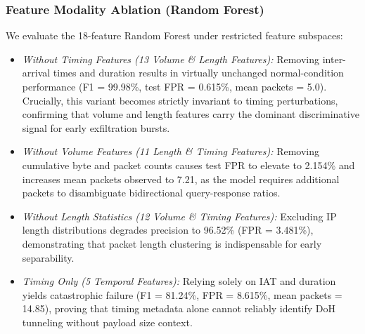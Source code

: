 \documentclass[conference]{IEEEtran}
\begin{document}
\subsubsection{Feature Modality Ablation (Random Forest)}
We evaluate the 18-feature Random Forest under restricted feature subspaces:
\begin{itemize}
    \item \emph{Without Timing Features (13 Volume \& Length Features):} Removing inter-arrival times and duration results in virtually unchanged normal-condition performance (F1 = 99.98\%, test FPR = 0.615\%, mean packets = 5.0). Crucially, this variant becomes strictly invariant to timing perturbations, confirming that volume and length features carry the dominant discriminative signal for early exfiltration bursts.
    \item \emph{Without Volume Features (11 Length \& Timing Features):} Removing cumulative byte and packet counts causes test FPR to elevate to 2.154\% and increases mean packets observed to 7.21, as the model requires additional packets to disambiguate bidirectional query-response ratios.
    \item \emph{Without Length Statistics (12 Volume \& Timing Features):} Excluding IP length distributions degrades precision to 96.52\% (FPR = 3.481\%), demonstrating that packet length clustering is indispensable for early separability.
    \item \emph{Timing Only (5 Temporal Features):} Relying solely on IAT and duration yields catastrophic failure (F1 = 81.24\%, FPR = 8.615\%, mean packets = 14.85), proving that timing metadata alone cannot reliably identify DoH tunneling without payload size context.
\end{itemize}
\end{document}
